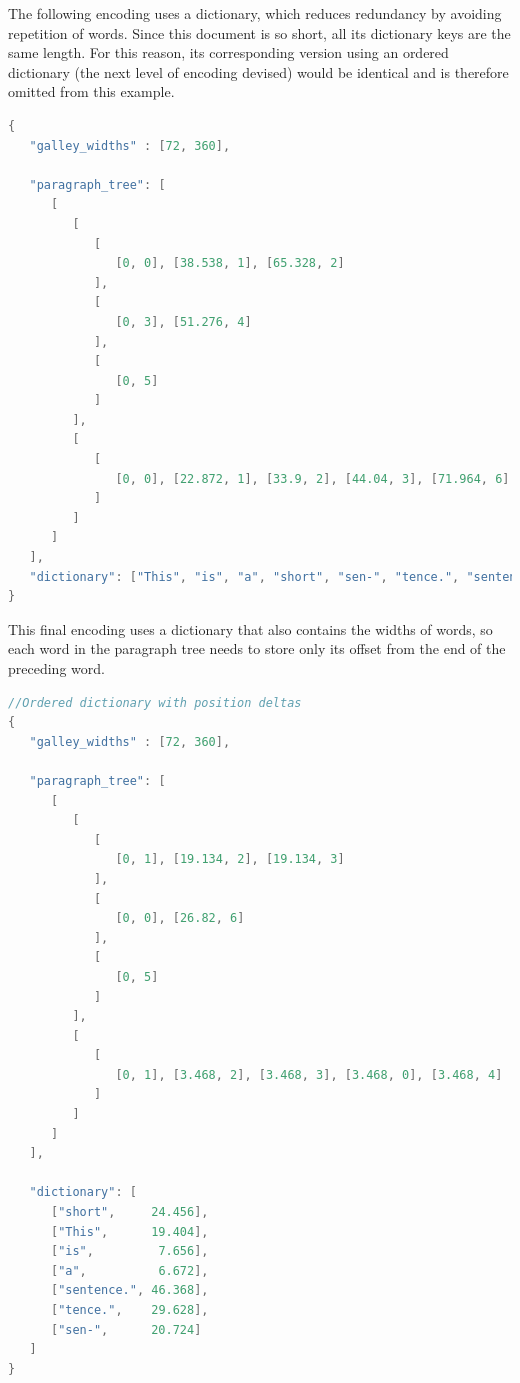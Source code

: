 \clearpage

The following encoding uses a dictionary, which reduces redundancy by avoiding repetition of words. Since this document is so short, all its dictionary keys are the same length. For this reason, its corresponding version using an ordered dictionary (the next level of encoding devised) would be identical and is therefore omitted from this example.

\vspace{0.5in}
\begin{lstlisting}[language=c,stringstyle=\color{blue},basicstyle=\ttfamily\footnotesize\singlespacing]
{
   "galley_widths" : [72, 360],

   "paragraph_tree": [
      [
         [
            [
               [0, 0], [38.538, 1], [65.328, 2]
            ],
            [
               [0, 3], [51.276, 4]
            ],
            [
               [0, 5]
            ]
         ],
         [
            [
               [0, 0], [22.872, 1], [33.9, 2], [44.04, 3], [71.964, 6]
            ]
         ]
      ]
   ],
   "dictionary": ["This", "is", "a", "short", "sen-", "tence.", "sentence."]
}
\end{lstlisting}

\clearpage

This final encoding uses a dictionary that also contains the widths of words, so each word in the paragraph tree needs to store only its offset from the end of the preceding word.

\vspace{0.5in}
\begin{lstlisting}[language=c,stringstyle=\color{blue},basicstyle=\ttfamily\footnotesize\singlespacing]
//Ordered dictionary with position deltas
{
   "galley_widths" : [72, 360],

   "paragraph_tree": [
      [
         [
            [
               [0, 1], [19.134, 2], [19.134, 3]
            ],
            [
               [0, 0], [26.82, 6]
            ],
            [
               [0, 5]
            ]
         ],
         [
            [
               [0, 1], [3.468, 2], [3.468, 3], [3.468, 0], [3.468, 4]
            ]
         ]
      ]
   ],

   "dictionary": [
      ["short",     24.456],
      ["This",      19.404],
      ["is",         7.656],
      ["a",          6.672],
      ["sentence.", 46.368],
      ["tence.",    29.628],
      ["sen-",      20.724]
   ]
}
\end{lstlisting}


